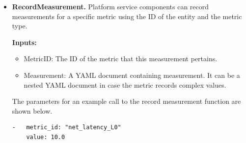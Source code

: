 \begin{itemize}
\item \textbf{RecordMeasurement.} Platform service components can record measurements for a specific metric  using the ID of the entity and the metric type. 
\par \noindent \textbf{Inputs:}
\begin{itemize}
\item MetricID: The ID of the metric that this measurement pertains.
\item Measurement: A YAML document containing measurement. It can be a nested YAML document in case the metric records complex values.
\end{itemize}
\par The parameters for an example call to the record measurement function are shown below.
\begin{verbatim}
-   metric_id: "net_latency_L0"
    value: 10.0
\end{verbatim}



\end{itemize}
